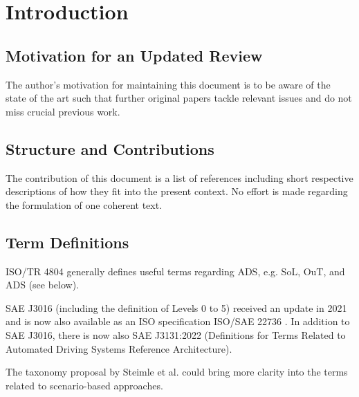 \documentclass[conference]{IEEEtran}
\newcommand{\new}[1]{{\color{my-red}#1}}
\begin{document}





\section{Introduction}
\label{intro}



\subsection{Motivation for a\new{n Updated} Review}
The author's motivation for maintaining this document is to be aware of the state of the art such that further original papers tackle relevant issues and do not miss crucial previous work. 


\subsection{Structure and Contributions}
The contribution of this document is a list of references including short respective descriptions of how they fit into the present context. 
No effort is made regarding the formulation of one coherent text. 

\subsection{Term Definitions}
\label{sec:definitions}

ISO/TR 4804 \cite{ISO_TR_4804_2020} generally defines useful terms regarding ADS, e.g. SoL, OuT, and ADS (see below). 

SAE J3016 (including the definition of Levels 0 to 5) received an update in 2021 \cite{sae2021j3016} and is now also available as an ISO specification ISO/SAE 22736 \cite{ISOSAE_22736_terms2021}.
In addition to SAE J3016, there is now also SAE J3131:2022 \cite{sae2022j3131} (Definitions for Terms Related to Automated Driving Systems Reference Architecture).


The taxonomy proposal by Steimle et al. \cite{Steimle2021taxonomy} could bring more clarity into the terms related to scenario-based approaches. 
\end{document}
